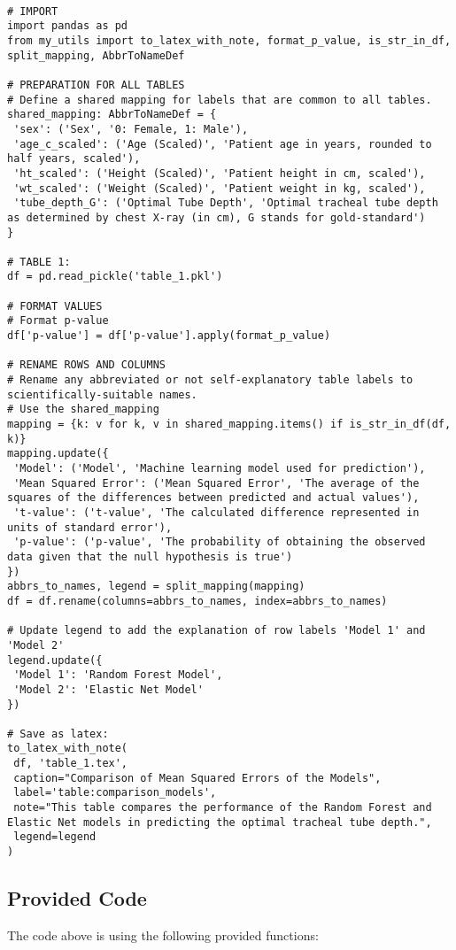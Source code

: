 \documentclass[11pt]{article}
\begin{document}
\begin{verbatim}

# IMPORT
import pandas as pd
from my_utils import to_latex_with_note, format_p_value, is_str_in_df, split_mapping, AbbrToNameDef

# PREPARATION FOR ALL TABLES
# Define a shared mapping for labels that are common to all tables.
shared_mapping: AbbrToNameDef = {
 'sex': ('Sex', '0: Female, 1: Male'),
 'age_c_scaled': ('Age (Scaled)', 'Patient age in years, rounded to half years, scaled'),
 'ht_scaled': ('Height (Scaled)', 'Patient height in cm, scaled'),
 'wt_scaled': ('Weight (Scaled)', 'Patient weight in kg, scaled'),
 'tube_depth_G': ('Optimal Tube Depth', 'Optimal tracheal tube depth as determined by chest X-ray (in cm), G stands for gold-standard')
}

# TABLE 1:
df = pd.read_pickle('table_1.pkl')

# FORMAT VALUES
# Format p-value
df['p-value'] = df['p-value'].apply(format_p_value)

# RENAME ROWS AND COLUMNS
# Rename any abbreviated or not self-explanatory table labels to scientifically-suitable names.
# Use the shared_mapping
mapping = {k: v for k, v in shared_mapping.items() if is_str_in_df(df, k)} 
mapping.update({
 'Model': ('Model', 'Machine learning model used for prediction'), 
 'Mean Squared Error': ('Mean Squared Error', 'The average of the squares of the differences between predicted and actual values'), 
 't-value': ('t-value', 'The calculated difference represented in units of standard error'),
 'p-value': ('p-value', 'The probability of obtaining the observed data given that the null hypothesis is true')
}) 
abbrs_to_names, legend = split_mapping(mapping)
df = df.rename(columns=abbrs_to_names, index=abbrs_to_names)

# Update legend to add the explanation of row labels 'Model 1' and 'Model 2'
legend.update({
 'Model 1': 'Random Forest Model',
 'Model 2': 'Elastic Net Model'
})

# Save as latex:
to_latex_with_note(
 df, 'table_1.tex',
 caption="Comparison of Mean Squared Errors of the Models", 
 label='table:comparison_models',
 note="This table compares the performance of the Random Forest and Elastic Net models in predicting the optimal tracheal tube depth.",
 legend=legend
)

\end{verbatim}

\subsection{Provided Code}
The code above is using the following provided functions:
\end{document}
